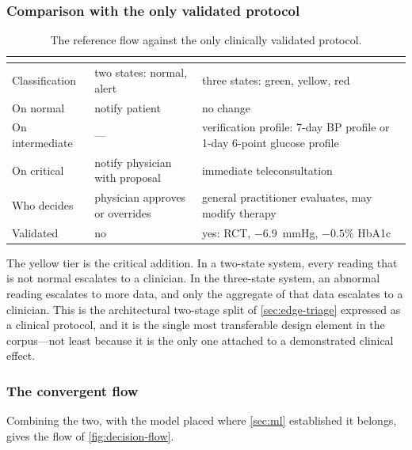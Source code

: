 \documentclass[12pt,a4paper,oneside]{report}
\begin{document}
\subsubsection{Comparison with the only validated protocol}

\begin{table}[htbp]
\centering\footnotesize
\caption{The reference flow against the only clinically validated protocol.}\label{tab:flow-compare}
\begin{tabularx}{\textwidth}{@{}>{\raggedright\arraybackslash}p{2.6cm} >{\raggedright\arraybackslash}X >{\raggedright\arraybackslash}X@{}}
\toprule
 & \textbf{\textcite{yazdani2018}} & \textbf{\textcite{mihevc2025}} \\
\midrule
Classification & two states: normal, alert & three states: green, yellow, red \\
On normal & notify patient & no change \\
On intermediate & --- & verification profile: 7-day BP profile or 1-day 6-point glucose profile \\
On critical & notify physician with proposal & immediate teleconsultation \\
Who decides & physician approves or overrides & general practitioner evaluates, may modify therapy \\
Validated & no & yes: RCT, $-6.9$~mmHg, $-0.5\%$ HbA1c \\
\bottomrule
\end{tabularx}
\end{table}

The yellow tier is the critical addition. In a two-state system, every reading that is not normal escalates to a clinician. In the three-state system, an abnormal reading escalates to more data, and only the aggregate of that data escalates to a clinician. This is the architectural two-stage split of \cref{sec:edge-triage} expressed as a clinical protocol, and it is the single most transferable design element in the corpus---not least because it is the only one attached to a demonstrated clinical effect.

\subsubsection{The convergent flow}

Combining the two, with the model placed where \cref{sec:ml} established it belongs, gives the flow of \cref{fig:decision-flow}.
\end{document}
